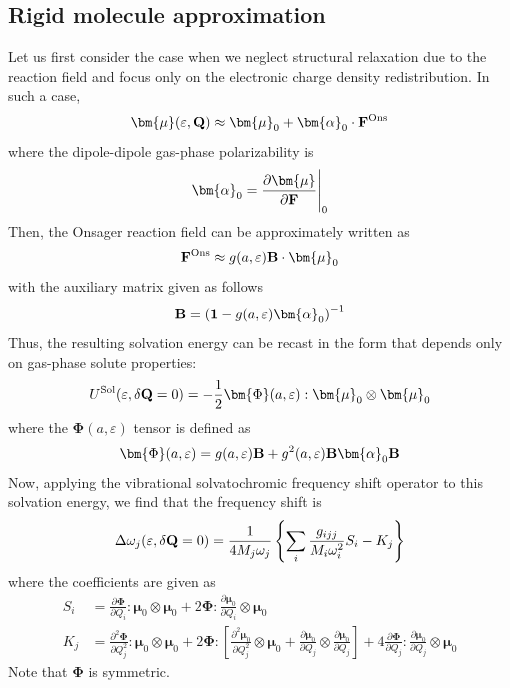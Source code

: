\documentclass[a4paper,titlepage,twoside,fleqn,12pt]{book}
\newcommand{\BM}[1]{\bm{#1}}
\newcommand{\fderiv}[2]{\ensuremath{
    \frac{\partial #1}{\partial #2}}}
\newcommand{\sderiv}[2]{\ensuremath{
    \frac{\partial^2 #1}{\partial #2^2}
    }}
\begin{document}
\begin{refsection}
\subsection{Rigid molecule approximation}

Let us first consider the case when we neglect structural
relaxation due to the reaction field and focus only
on the electronic charge density redistribution. In such a case,
%
\begin{equation}
 {\BM \mu}(\varepsilon, {\bf Q}) \approx 
 {\BM \mu}_0 + {\BM \alpha}_0  \cdot {\bf F}^{\rm Ons}
\end{equation}
%
where the dipole\hyp{}dipole gas\hyp{}phase polarizability is
%
\begin{equation}
{\BM \alpha}_0  = \fderiv{{\BM \mu}}{\bf F}\Bigg|_{0}
\end{equation}
%
Then, the Onsager reaction field can be approximately written as
%
\begin{equation}
{\bf F}^{\rm Ons} \approx g(a,\varepsilon) {\bf B} \cdot {\BM \mu}_0
\end{equation}
%
with the auxiliary matrix given as follows
%
\begin{equation}
{\bf B} = \left( {\bf 1} - g(a,\varepsilon){\BM \alpha}_0 \right)^{-1}
\end{equation}
%
Thus, the resulting solvation energy can be recast in the form
that depends only on gas\hyp{}phase solute properties:
%
\begin{equation} \label{e:ons-e-sol-init}
U^{\rm Sol}(\varepsilon, \delta{\bf Q}=0) = -\frac{1}{2} {\BM \Phi}(a, \varepsilon) : {\BM \mu}_0 \otimes {\BM \mu}_0
\end{equation}
%
where the ${\BM \Phi}(a, \varepsilon)$ tensor is defined as
%
\begin{equation}
{\BM \Phi}(a, \varepsilon) = g(a,\varepsilon) {\bf B} + g^2(a,\varepsilon) {\bf B} {\BM \alpha}_0 {\bf B}
\end{equation}
%
Now, applying the vibrational solvatochromic frequency shift
operator to this solvation energy,
we find that the frequency shift is
%
\begin{equation} \label{e:dw-ons-working-form}
\Delta\omega_j(\varepsilon, \delta{\bf Q}=0) = \frac{1}{4M_j\omega_j}
\left\{ \sum_i \frac{g_{ijj}}{M_i\omega_i^2}S_i - K_j \right\}
\end{equation}
%
where the coefficients are given as
%
\begin{subequations}
 \begin{align}
  S_i &= \fderiv{{\BM \Phi}}{Q_i} : {\BM \mu}_0 \otimes {\BM \mu}_0 
           + 2{\BM \Phi} : \fderiv{{\BM \mu}_0}{Q_i} \otimes {\BM \mu}_0 \label{e:ons-si-init}\\
  K_j &= \sderiv{{\BM \Phi}}{Q_j} : {\BM \mu}_0 \otimes {\BM \mu}_0
           + 2{\BM \Phi} : \left[ \sderiv{{\BM \mu}_0}{Q_j} \otimes {\BM \mu}_0 
           +  \fderiv{{\BM \mu}_0}{Q_j} \otimes \fderiv{{\BM \mu}_0}{Q_j} \right] 
           + 4\fderiv{{\BM \Phi}}{Q_j} : \fderiv{{\BM \mu}_0}{Q_j} \otimes {\BM \mu}_0  \label{e:ons-ki-init}
 \end{align}
\end{subequations}
%
Note that ${\BM \Phi}$ is symmetric.  


\end{refsection}
\end{document}
